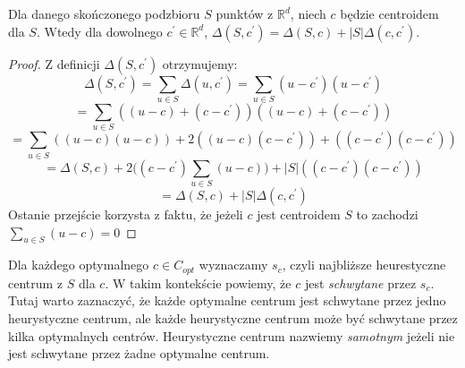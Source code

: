 \begin{lemma}
    Dla danego skończonego podzbioru $S$ punktów z $\mathbb{R}^d$, niech $c$ będzie centroidem dla $S$. Wtedy dla dowolnego $c^{'} \in \mathbb{R}^d$, $\Delta(S, c^{'}) = \Delta(S, c) + |S|\Delta(c, c^{'})$.
\end{lemma}
\begin{proof}
    Z definicji $\Delta(S, c^{'})$ otrzymujemy:
    \begin{equation}
        \Delta(S, c^{'}) = \sum_{u \in S} \Delta(u, c^{'}) =  \sum_{u \in S} (u - c^{'}) (u - c^{'})
    \end{equation}
    \begin{equation}
         = \sum_{u \in S} ((u - c) + (c - c^{'})) ((u - c) + (c - c^{'}))
    \end{equation}
    \begin{equation}
        = \sum_{u \in S} ((u - c)(u - c)) + 2((u - c)(c - c^{'})) + ((c - c^{'})(c - c^{'}))
    \end{equation}
    \begin{equation}
        = \Delta(S, c) + 2\Big( (c - c^{'}) \sum_{u \in S} (u - c) \Big) + |S|((c - c^{'})(c - c^{'}))
    \end{equation}
    \begin{equation}
        = \Delta(S, c) + |S|\Delta(c,c^{'})
    \end{equation}
    Ostanie przejście korzysta z faktu, że jeżeli $c$ jest centroidem $S$ to zachodzi $\sum_{u \in S} (u - c) = 0$
\end{proof}

\noindent
Dla każdego optymalnego $c \in C_{opt}$ wyznaczamy $s_{c}$, czyli najbliższe heurestyczne centrum z $S$ dla $c$.
W takim kontekście powiemy, że $c$ jest \textit{schwytane} przez $s_{c}$.
Tutaj warto zaznaczyć, że każde optymalne centrum jest schwytane przez jedno heurystyczne centrum, ale każde heurystyczne centrum może być schwytane przez kilka optymalnych centrów.
Heurystyczne centrum nazwiemy \textit{samotnym} jeżeli nie jest schwytane przez żadne optymalne centrum.

